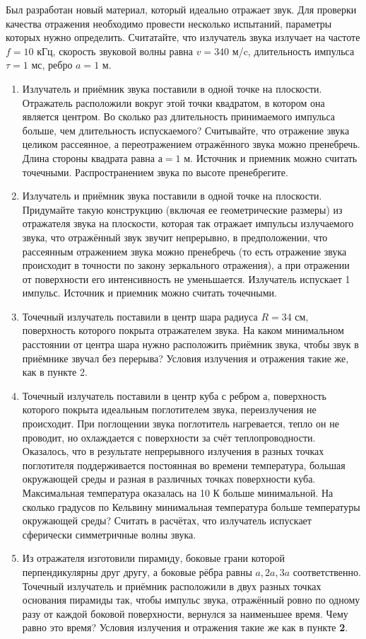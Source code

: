 
Был разработан новый материал, который идеально отражает звук. Для проверки качества отражения необходимо провести несколько испытаний, параметры которых нужно определить. Считатайте, что излучатель звука излучает на частоте $f = 10$ кГц, скорость звуковой волны равна $v = 340$ м/c, длительность импульса $\tau = 1$ мс, ребро $a = 1$ м.
\begin{enumerate}
\item Излучатель и приёмник звука поставили в одной точке на плоскости.  Отражатель расположили вокруг этой точки квадратом, в котором она является центром. Во сколько раз длительность принимаемого импульса больше, чем длительность испускаемого? Считывайте, что отражение звука целиком рассеянное, $а$ переотражением отражённого звука можно пренебречь. Длина стороны квадрата равна $а = 1$ м. Источник и приемник можно считать точечными. Распространением звука по высоте пренебрегите.
\item Излучатель и приёмник звука поставили в одной точке на плоскости. Придумайте такую конструкцию (включая ее геометрические размеры) из отражателя звука на плоскости, которая так отражает импульсы излучаемого звука, что отражённый звук звучит непрерывно, в предположении, что рассеянным отражением звука можно пренебречь (то есть отражение звука происходит в точности по закону зеркального отражения), а при отражении от поверхности его интенсивность не уменьшается. Излучатель испускает 1 импульс.  Источник и приемник можно считать точечными.
\item Точечный излучатель поставили в центр шара радиуса $R = 34$ см, поверхность которого покрыта отражателем звука. На каком минимальном расстоянии от центра шара нужно расположить приёмник звука, чтобы звук в приёмнике звучал без перерыва? Условия излучения и отражения такие же, как в пункте 2.
\item Точечный излучатель поставили в центр куба с ребром а, поверхность которого покрыта идеальным поглотителем звука, переизлучения не происходит. При поглощении звука поглотитель нагревается, тепло он не проводит, но охлаждается с поверхности за счёт теплопроводности. Оказалось, что в результате непрерывного излучения в разных точках поглотителя поддерживается постоянная во времени температура, большая окружающей среды и разная в различных точках поверхности куба. Максимальная температура оказалась на 10 К больше минимальной.  На сколько градусов по Кельвину минимальная температура больше температуры окружающей среды? Считать в расчётах, что излучатель испускает сферически симметричные волны звука.
\item Из отражателя изготовили пирамиду, боковые грани которой перпендикулярны друг другу, а боковые рёбра равны $a, 2a, 3a$ соответственно. Точечный излучатель и приёмник расположили в двух разных точках основания пирамиды так, чтобы импульс звука, отражённый ровно по одному разу от каждой боковой поверхности, вернулся за наименьшее время. Чему равно это время? Условия излучения и отражения такие же как в пункте \textbf{2}. 

\end{enumerate}
